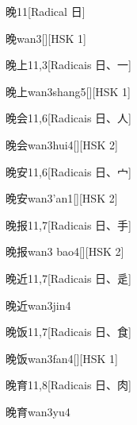\begin{entry}{晚}{11}[Radical ⽇]
  \begin{phonetics}{晚}{wan3}[][HSK 1]
  \end{phonetics}
\end{entry}

\begin{entry}{晚上}{11,3}[Radicais ⽇、⼀]
  \begin{phonetics}{晚上}{wan3shang5}[][HSK 1]
  \end{phonetics}
\end{entry}

\begin{entry}{晚会}{11,6}[Radicais ⽇、⼈]
  \begin{phonetics}{晚会}{wan3hui4}[][HSK 2]
  \end{phonetics}
\end{entry}

\begin{entry}{晚安}{11,6}[Radicais ⽇、⼧]
  \begin{phonetics}{晚安}{wan3'an1}[][HSK 2]
  \end{phonetics}
\end{entry}

\begin{entry}{晚报}{11,7}[Radicais ⽇、⼿]
  \begin{phonetics}{晚报}{wan3 bao4}[][HSK 2]
  \end{phonetics}
\end{entry}

\begin{entry}{晚近}{11,7}[Radicais ⽇、⾡]
  \begin{phonetics}{晚近}{wan3jin4}
  \end{phonetics}
\end{entry}

\begin{entry}{晚饭}{11,7}[Radicais ⽇、⾷]
  \begin{phonetics}{晚饭}{wan3fan4}[][HSK 1]
  \end{phonetics}
\end{entry}

\begin{entry}{晚育}{11,8}[Radicais ⽇、⾁]
  \begin{phonetics}{晚育}{wan3yu4}
  \end{phonetics}
\end{entry}

